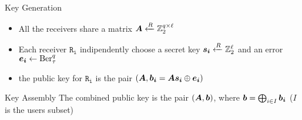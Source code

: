 \begin{frame}
\begin{block}{Key Generation}
 \begin{itemize}
  \item All the receivers share a matrix $\boldsymbol{A}  \xleftarrow{R} \mathbb{Z}_2^{q \times \ell}$
  \item Each receiver $\mathtt{R_i}$ \alert{indipendently} choose a secret key $\boldsymbol{s_i} \xleftarrow{R} \mathbb{Z}_2^{\ell}$ and an error $\boldsymbol{e_i} \gets \mathrm{Ber}_{\tau}^{q}$
  \item the public key for $\mathtt{R_i}$ is the pair $\left( \boldsymbol{A},\boldsymbol{b_i}=\boldsymbol{A}\boldsymbol{s_i} \mathbin{\oplus} \boldsymbol{e_i} \right)$
 \end{itemize}  
 \end{block}
 
 \begin{block}{Key Assembly}  
 The combined public key is the pair $\left( \boldsymbol{A},\boldsymbol{b} \right)$, where $\boldsymbol{b} = \bigoplus_{i \in I} \boldsymbol{b_i}$ ($I$ is the users subset)
 \end{block}

\end{frame}
